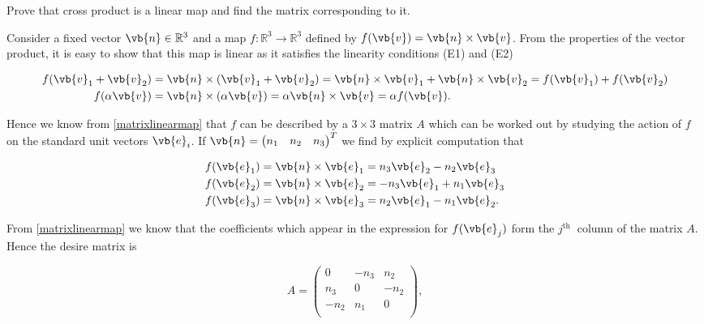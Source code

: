 \documentclass[a4paper,12pt]{report}
\begin{document}
{Prove that cross product is a linear map and find the matrix corresponding to it.}
{Consider a fixed vector \(\vb{n} \in \mathbb{R}^3 \) and a map \(f:\mathbb{R}^3 \rightarrow \mathbb{R}^3 \) defined by \(f(\vb{v} ) = \vb{n} \times \vb{v} \). From the properties of the vector product, it is easy to show that this map is linear as it satisfies the linearity conditions (E1) and (E2)

\begin{equation}
    \begin{aligned}
    f(\vb{v} _{1} + \vb{v} _{2}  ) &= \vb{n} \times (\vb{v} _{1} + \vb{v} _{2} ) = \vb{n} \times \vb{v} _{1} + \vb{n} \times \vb{v} _{2} = f(\vb{v} _{1} ) + f(\vb{v} _{2} ) \\
    f(\alpha \vb{v} ) &= \vb{n} \times (\alpha \vb{v} ) = \alpha \vb{n} \times \vb{v} = \alpha f(\vb{v} ).
    \end{aligned}
\end{equation}

Hence we know from \cref{matrixlinearmap} that \(f\) can be described by a \(3 \times 3\) matrix \(A\) which can be worked out by studying the action of \(f\) on the standard unit vectors \(\vb{e} _{i} \). If \(\vb{n} = \begin{pmatrix}
    n_{1}  & n_{2}  & n_3   \\
\end{pmatrix}^{T} \) we find by explicit computation that 

\begin{equation}
    \begin{aligned}
        f(\vb{e} _{1} ) &= \vb{n} \times \vb{e} _{1} = n_3 \vb{e} _{2} - n_{2} \vb{e} _{3} \\
        f(\vb{e} _{2} ) &= \vb{n} \times \vb{e} _{2}  = -n_3 \vb{e} _{1} + n_{1} \vb{e} _{3} \\
        f(\vb{e} _{3} ) &= \vb{n} \times \vb{e} _{3} = n_{2} \vb{e} _{1} - n_{1} \vb{e} _{2} .  
    \end{aligned}
\end{equation}

From \cref{matrixlinearmap} we know that the coefficients which appear in the expression for \(f(\vb{e} _{j})\) form the \(j^{\text{th }} \) column of the matrix \(A\). Hence the desire matrix is 

\begin{equation}
    A = \begin{pmatrix}
        0 & -n_3  & n_{2}   \\
        n_3  & 0 & -n_{2}   \\
        -n_{2}  & n_{1}  & 0  \\
    \end{pmatrix},
\end{equation}

}
\end{document}
